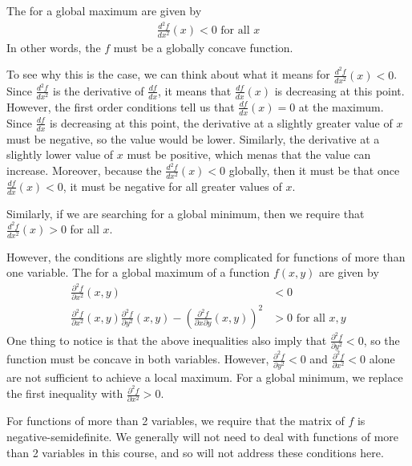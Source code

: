 The  for a global maximum are given by
\begin{align*}
    \frac{d^2f}{dx^2}(x) < 0 \text{ for all $x$}
\end{align*}
In other words, the $f$ must be a globally concave function. 


To see why this is the case, we can think about what it means for $\frac{d^2f}{dx^2}(x) < 0$. Since $\frac{d^2f}{dx^2}$ is the derivative of $\frac{df}{dx}$, it means that $\frac{df}{dx}(x)$ is decreasing at this point. However, the first order conditions tell us that $\frac{df}{dx}(x) = 0$ at the maximum. Since $\frac{df}{dx}$ is decreasing at this point, the derivative at a slightly greater value of $x$ must be negative, so the value would be lower. Similarly, the derivative at a slightly lower value of $x$ must be positive, which menas that the value can increase. Moreover, because the $\frac{d^2f}{dx^2}(x) < 0$ globally, then it must be that once $\frac{df}{dx}(x) < 0$, it must be negative for all greater values of $x$. 

Similarly, if we are searching for a global minimum, then we require that $\frac{d^2f}{dx^2}(x) > 0$ for all $x$. 

However, the conditions are slightly more complicated for functions of more than one variable. The  for a global maximum of a function $f(x, y)$ are given by
\begin{align*}
    \frac{\partial^2f}{\partial x^2}(x, y) &< 0 \\ 
    \frac{\partial^2f}{\partial x^2}(x, y) \frac{\partial^2f}{\partial y^2}(x, y) - \left(\frac{\partial^2f}{\partial x \partial y}(x, y)\right)^2 &> 0 \text{ for all $x, y$}
\end{align*}
One thing to notice is that the above inequalities also imply that $\frac{\partial^2f}{\partial y^2} < 0$, so the function must be concave in both variables. However, $\frac{\partial^2f}{\partial y^2} < 0$ and $\frac{\partial^2f}{\partial x^2} < 0$ alone are not sufficient to achieve a local maximum. For a global minimum, we replace the first inequality with $\frac{\partial^2f}{\partial x^2} > 0$. 

For functions of more than 2 variables, we require that the  matrix of $f$ is negative-semidefinite. We generally will not need to deal with functions of more than 2 variables in this course, and so will not address these conditions here. 

